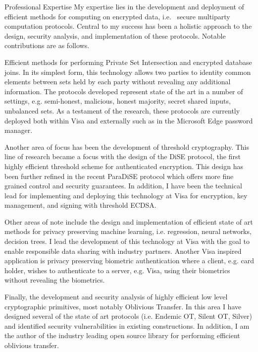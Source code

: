 \documentclass{resume} %
\begin{document}

\begin{rSection}{Professional Expertise}
	My expertise lies in the development and deployment of efficient methods for computing on encrypted data, i.e.  secure multiparty computation protocols. Central to my success has been a holistic approach to the design, security analysis, and implementation of these protocols. Notable contributions are as follows.
	
	Efficient methods for performing Private Set Intersection and encrypted database joins. In its simplest form, this technology allows two parties to identity common elements between sets held by each party without revealing any additional information. The protocols developed represent state of the art in a number of settings, e.g. semi-honest, malicious, honest majority, secret shared inputs, unbalanced sets. As a testament of the research, these protocols are currently deployed both within Visa and externally such as in the Microsoft Edge password manager.
	
	Another area of focus has been the development of threshold cryptography. This line of research became a focus with the design of the DiSE protocol, the first highly efficient threshold scheme for authenticated encryption. This design has been further refined in the recent ParaDiSE protocol which offers more fine grained control and security guarantees. In addition, I have been the technical lead for implementing and deploying this technology at Visa for encryption, key management, and signing with threshold ECDSA.
	
	Other areas of note include the design and implementation of efficient state of art methods for privacy preserving machine learning, i.e. regression, neural networks, decision trees. I lead the development of this technology at Visa with the goal to enable responsible data sharing with industry partners. Another Visa inspired application is privacy preserving biometric authentication where a client, e.g. card holder, wishes to authenticate to a server, e.g. Visa, using their biometrics without revealing the biometrics.
	
	Finally, the development and security analysis of highly efficient low level cryptographic primitives, most notably Oblivious Transfer. In this area I have designed several of the state of art protocols (i.e. Endemic OT, Silent OT, Silver) and identified security vulnerabilities in existing constructions. In addition, I am the author of the industry leading open source library for performing efficient oblivious transfer.


\end{rSection}
\end{document}

